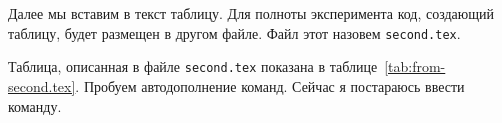 \documentclass[a4paper]{article}
\begin{document}
Далее мы вставим в текст таблицу. Для полноты эксперимента код, создающий таблицу, будет размещен 
в другом файле. Файл этот назовем \texttt{second.tex}.
\begin{table}

\label{tab:from-second.tex}
\end{table}
Таблица, описанная в файле \texttt{second.tex} показана в таблице~\ref{tab:from-second.tex}.
Пробуем автодополнение команд. Сейчас я постараюсь ввести команду. 
\end{document}
